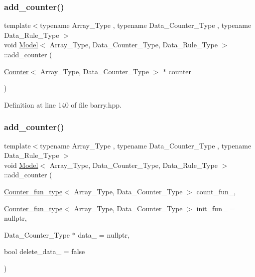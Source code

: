 \subsubsection{\texorpdfstring{add\+\_\+counter()}{add\_counter()}\hspace{0.1cm}{\footnotesize\ttfamily [2/3]}}
{\footnotesize\ttfamily template$<$typename Array\+\_\+\+Type , typename Data\+\_\+\+Counter\+\_\+\+Type , typename Data\+\_\+\+Rule\+\_\+\+Type $>$ \\
void \hyperlink{classbarry_1_1_model}{Model}$<$ Array\+\_\+\+Type, Data\+\_\+\+Counter\+\_\+\+Type, Data\+\_\+\+Rule\+\_\+\+Type $>$\+::add\+\_\+counter (\begin{DoxyParamCaption}\item[{\hyperlink{classbarry_1_1_counter}{Counter}$<$ Array\+\_\+\+Type, Data\+\_\+\+Counter\+\_\+\+Type $>$ $\ast$}]{counter }\end{DoxyParamCaption})\hspace{0.3cm}{\ttfamily [inline]}}



Definition at line 140 of file barry.\+hpp.

\mbox{\label{classbarry_1_1_model_a4e4a18943bda513a844dc11aa088a698}} 
\subsubsection{\texorpdfstring{add\+\_\+counter()}{add\_counter()}\hspace{0.1cm}{\footnotesize\ttfamily [3/3]}}
{\footnotesize\ttfamily template$<$typename Array\+\_\+\+Type , typename Data\+\_\+\+Counter\+\_\+\+Type , typename Data\+\_\+\+Rule\+\_\+\+Type $>$ \\
void \hyperlink{classbarry_1_1_model}{Model}$<$ Array\+\_\+\+Type, Data\+\_\+\+Counter\+\_\+\+Type, Data\+\_\+\+Rule\+\_\+\+Type $>$\+::add\+\_\+counter (\begin{DoxyParamCaption}\item[{\hyperlink{namespacebarry_abaaae3200da8e4b7faac3c04fe9c3081}{Counter\+\_\+fun\+\_\+type}$<$ Array\+\_\+\+Type, Data\+\_\+\+Counter\+\_\+\+Type $>$}]{count\+\_\+fun\+\_\+,  }\item[{\hyperlink{namespacebarry_abaaae3200da8e4b7faac3c04fe9c3081}{Counter\+\_\+fun\+\_\+type}$<$ Array\+\_\+\+Type, Data\+\_\+\+Counter\+\_\+\+Type $>$}]{init\+\_\+fun\+\_\+ = {\ttfamily nullptr},  }\item[{Data\+\_\+\+Counter\+\_\+\+Type $\ast$}]{data\+\_\+ = {\ttfamily nullptr},  }\item[{bool}]{delete\+\_\+data\+\_\+ = {\ttfamily false} }\end{DoxyParamCaption})\hspace{0.3cm}{\ttfamily [inline]}}



